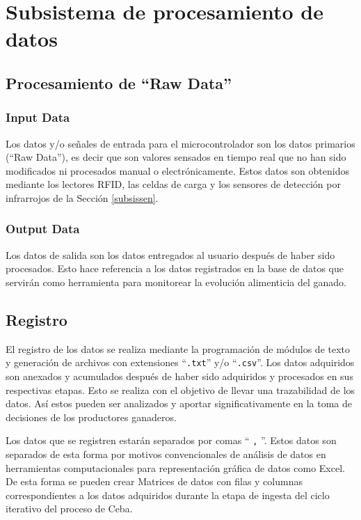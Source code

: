 
\section{Subsistema de procesamiento de datos} \label{subsisdata}
\subsection{Procesamiento de ``Raw Data''}
\subsubsection{Input Data}

Los datos y/o señales de entrada para  el microcontrolador son los datos primarios (``Raw Data''), es decir que son valores sensados en tiempo real que no han sido modificados ni procesados manual o electrónicamente. Estos datos son obtenidos mediante los lectores RFID, las celdas de carga y los sensores de detección por infrarrojos de la Sección \ref{subsissen}.

\subsubsection{Output Data}

Los datos de salida son los datos entregados al usuario después de haber sido procesados. Esto hace referencia a los datos registrados en la base de datos que servirán como herramienta para monitorear la evolución alimenticia del ganado.

\subsection{Registro}

El registro de los datos se realiza mediante la programación de módulos de texto y generación de archivos con extensiones ``\texttt{.txt}'' y/o ``\texttt{.csv}''. Los datos adquiridos son anexados y acumulados después de haber sido adquiridos y procesados en sus respectivas etapas. Esto se realiza con el objetivo de llevar una trazabilidad de los datos. Así estos pueden ser analizados y aportar significativamente en la toma de decisiones de los productores ganaderos.

Los datos que se registren estarán separados por comas `` \texttt{,} ''. Estos datos son separados de esta forma por motivos convencionales de análisis de datos en herramientas computacionales para representación gráfica de datos como Excel. De esta forma se pueden crear Matrices de datos con filas y columnas correspondientes a los datos adquiridos durante la etapa de ingesta del ciclo iterativo del proceso de Ceba.


